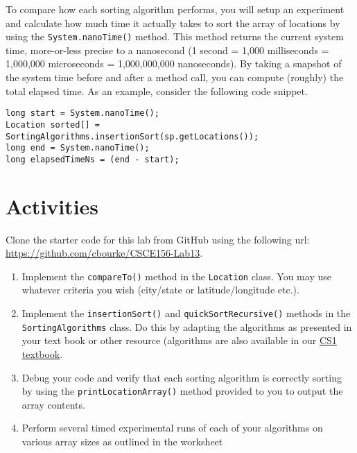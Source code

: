 \documentclass[12pt]{scrartcl}
\begin{document}
To compare how each sorting algorithm performs, you will setup an 
experiment and calculate how much time it actually takes to sort the 
array of locations by using the \texttt{System.nanoTime()} 
method.  This method returns the current system time, more-or-less 
precise to a nanosecond (1 second = 1,000 milliseconds = 1,000,000 
microseconds = 1,000,000,000 nanoseconds).  By taking a snapshot of 
the system time before and after a method call, you can compute 
(roughly) the total elapsed time.  As an example, consider the 
following code snippet.

\begin{verbatim}
long start = System.nanoTime();
Location sorted[] = SortingAlgorithms.insertionSort(sp.getLocations());
long end = System.nanoTime();
long elapsedTimeNs = (end - start);
\end{verbatim}

\section*{Activities}

Clone the starter code for this lab from GitHub using the following
url: \url{https://github.com/cbourke/CSCE156-Lab13}.

\begin{enumerate}
  \item Implement the \texttt{compareTo()} method in the 
    \texttt{Location} class.  You may use whatever criteria
    you wish (city/state or latitude/longitude etc.).
  \item Implement the \texttt{insertionSort()} and 
    \texttt{quickSortRecursive()} methods in the 
    \texttt{SortingAlgorithms} class.  Do this by adapting 
    the algorithms as presented in your text book or other
    resource (algorithms are also available in our
    \href{https://bitbucket.org/chrisbourke/computersciencei/raw/44fb9b39be3221dc02c1b5d0712f9b9f03260e46/ComputerScienceOne.pdf}{CS1 textbook}.
  \item Debug your code and verify that each sorting algorithm is 
    correctly sorting by using the \texttt{printLocationArray()} 
    method provided to you to output the array contents. 
  \item Perform several timed experimental runs of each of your 
    algorithms on various array sizes as outlined in the worksheet
\end{enumerate}
\end{document}
